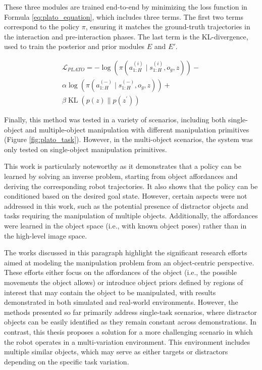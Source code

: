 These three modules are trained end-to-end by minimizing the loss function in Formula \ref{eq:plato_equation}, which includes three terms. The first two terms correspond to the policy \( \pi \), ensuring it matches the ground-truth trajectories in the interaction and pre-interaction phases. The last term is the KL-divergence, used to train the posterior and prior modules \( E \) and \( E' \).

\begin{equation}
    \label{eq:plato_equation}
    \begin{aligned}
        \mathcal{L}_{PLATO} = -\log \left(\pi\left(a_{1: H}^{(i)} \mid s_{1: H}^{(i)}, o_g, z\right)\right)- \\ 
        \alpha \log \left(\pi\left(a_{1: H}^{(-)} \mid s_{1: H}^{(-)}, o_g, z\right)\right)+ \\ 
        \beta \operatorname{KL}\left(p(z) \| p\left(z^{\prime}\right)\right)
    \end{aligned}
\end{equation}


Finally, this method was tested in a variety of scenarios, including both single-object and multiple-object manipulation with different manipulation primitives (Figure \ref{fig:plato_task}). However, in the multi-object scenarios, the system was only tested on single-object manipulation primitives.

This work is particularly noteworthy as it demonstrates that a policy can be learned by solving an inverse problem, starting from object affordances and deriving the corresponding robot trajectories. It also shows that the policy can be conditioned based on the desired goal state. However, certain aspects were not addressed in this work, such as the potential presence of distractor objects and tasks requiring the manipulation of multiple objects. Additionally, the affordances were learned in the object space (i.e., with known object poses) rather than in the high-level image space.

The works discussed in this paragraph highlight the significant research efforts aimed at modeling the manipulation problem from an object-centric perspective. These efforts either focus on the affordances of the object (i.e., the possible movements the object allows) or introduce object priors defined by regions of interest that may contain the object to be manipulated, with results demonstrated in both simulated and real-world environments. However, the methods presented so far primarily address single-task scenarios, where distractor objects can be easily identified as they remain constant across demonstrations. In contrast, this thesis proposes a solution for a more challenging scenario in which the robot operates in a multi-variation environment. This environment includes multiple similar objects, which may serve as either targets or distractors depending on the specific task variation.
